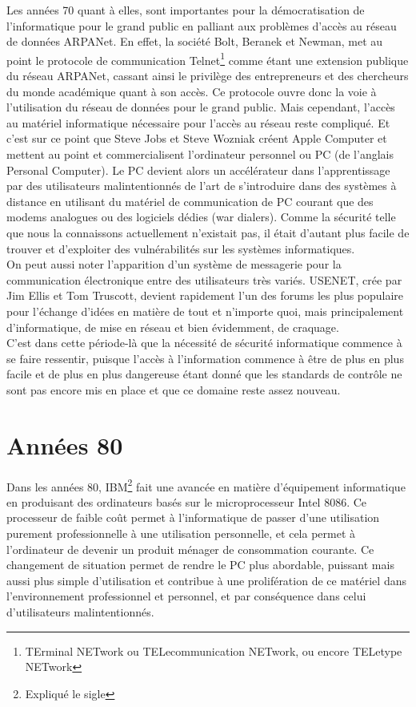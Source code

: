\documentclass[a4paper]{memoir}
\begin{document}
Les années 70 quant à elles, sont importantes pour la démocratisation de l'informatique pour le grand public en palliant aux problèmes d'accès au réseau de données ARPANet. En effet, la société Bolt, Beranek et Newman, met au point le protocole de communication Telnet\footnote{TErminal NETwork ou TELecommunication NETwork, ou encore TELetype NETwork} comme étant une extension publique du réseau ARPANet, cassant ainsi le privilège des entrepreneurs et des chercheurs du monde académique quant à son accès. Ce protocole ouvre donc la voie à l'utilisation du réseau de données pour le grand public. Mais cependant, l'accès au matériel informatique nécessaire pour l'accès au réseau reste compliqué. Et c'est sur ce point que Steve Jobs et Steve Wozniak créent Apple Computer et mettent au point et commercialisent l'ordinateur personnel ou PC (de l'anglais Personal Computer). Le PC devient alors un accélérateur dans l'apprentissage par des utilisateurs malintentionnés de l'art de s'introduire dans des systèmes à distance en utilisant du matériel de communication de PC courant que des modems analogues ou des logiciels dédies (war dialers). Comme la sécurité telle que nous la connaissons actuellement n'existait pas, il était d'autant plus facile de trouver et d'exploiter des vulnérabilités sur les systèmes informatiques.\\
\noindent On peut aussi noter l'apparition d'un système de messagerie pour la communication électronique entre des utilisateurs très variés. USENET, crée par Jim Ellis et Tom Truscott, devient rapidement l'un des forums les plus populaire pour l'échange d'idées en matière de tout et n'importe quoi, mais principalement d'informatique, de mise en réseau et bien évidemment, de craquage.\\
C'est dans cette période-là que la nécessité de sécurité informatique commence à se faire ressentir, puisque l'accès à l'information commence à être de plus en plus facile et de plus en plus dangereuse étant donné que les standards de contrôle ne sont pas encore mis en place et que ce domaine reste assez nouveau.


\section{Années 80}

Dans les années 80, IBM\footnote{Expliqué le sigle} fait une avancée en matière d'équipement informatique en produisant des ordinateurs basés sur le microprocesseur Intel 8086. Ce processeur de faible coût permet à l'informatique de passer d'une utilisation purement professionnelle à une utilisation personnelle, et cela permet à l'ordinateur de devenir un produit ménager de consommation courante. Ce changement de situation permet de rendre le PC plus abordable, puissant mais aussi plus simple d'utilisation et contribue à une prolifération de ce matériel dans l'environnement professionnel et personnel, et par conséquence dans celui d'utilisateurs malintentionnés.
\end{document}

